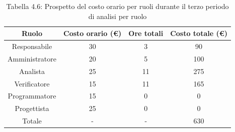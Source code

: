 \begin{table}[h]
	\setlength\extrarowheight{5pt}
	\centering
	\begin{tabularx}{\textwidth}{|ccc|c|}
		\hline
		\rowcolor{white}
		\textbf{Ruolo} & \textbf{Costo orario (€)} & \textbf{Ore totali} & \textbf{Costo totale (€)} \\
		\hline
		Responsabile &30&3&90 \\
		Amministratore &20&5&100 \\
		Analista &25&11&275 \\
		Verificatore &15&11&165 \\
		Programmatore &15&0&0 \\
		Progettista &25&0&0 \\
		\hline
		Totale &-&-&630 \\
		\hline
	\end{tabularx}
    \vspace{10pt}
	\caption{Tabella 4.6: Prospetto del costo orario per ruoli durante il terzo periodo di analisi per ruolo}
\end{table}
%
\newpage
